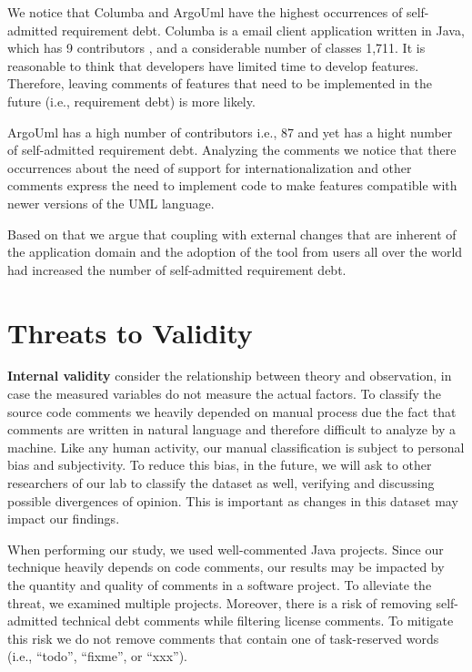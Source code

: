 We notice that Columba and ArgoUml have the highest occurrences of self-admitted requirement debt. Columba is a email client application written in Java, which has 9 contributors \cite{Openhub:home}, and a considerable number of classes 1,711. It is reasonable to think that developers have limited time to develop features. Therefore, leaving comments of features that need to be implemented in the future (i.e., requirement debt) is more likely. 

ArgoUml has a high number of contributors i.e., 87 and yet has a hight number of self-admitted requirement debt. Analyzing the comments we notice that there occurrences about the need of support for internationalization and other comments express the need to implement code to make features compatible with newer versions of the UML language. 

Based on that we argue that coupling with external changes that are inherent of the application domain and the adoption of the tool from users all over the world \cite{Openhub:home} had increased the number of self-admitted requirement debt. 


\section{Threats to Validity}
\label{chap3:sec:threats_to_validity}

\noindent\textbf{Internal validity} consider the relationship between theory and observation, in case the measured variables do not measure the actual factors. To classify the source code comments we heavily depended on manual process due the fact that comments are written in natural language and therefore difficult to analyze by a machine. Like any human activity, our manual classification is subject to personal bias and subjectivity. To reduce this bias, in the future, we will ask to other researchers of our lab to classify the dataset as well, verifying and discussing possible divergences of opinion. This is important as changes in this dataset may impact our findings. 

When performing our study, we used well-commented Java projects. Since our technique heavily depends on code comments, our results may be impacted by the quantity and quality of comments in a software project. To alleviate the threat, we examined multiple projects. Moreover, there is a risk of removing self-admitted technical debt comments while filtering license comments. To mitigate this risk we do not remove comments that contain one of task-reserved words (i.e., ``todo'', ``fixme'', or ``xxx'').

